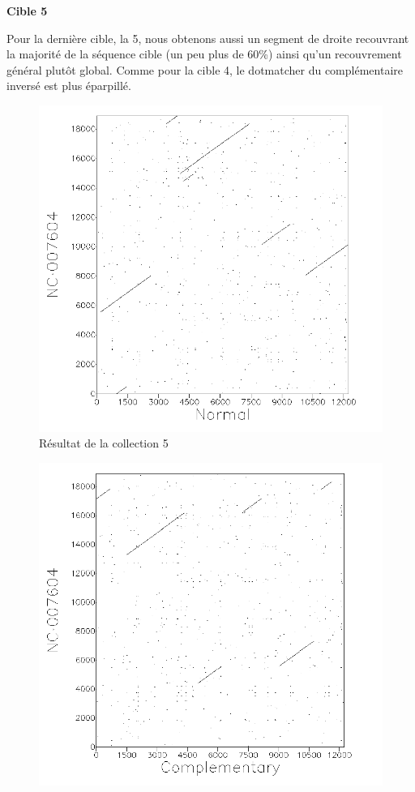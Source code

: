 \FloatBarrier

\noindent\textbf{Cible 5}

Pour la dernière cible, la 5, nous obtenons aussi un segment de droite
recouvrant la majorité de la séquence cible (un peu plus de 60\%) ainsi qu'un
recouvrement général plutôt global. Comme pour la cible 4, le dotmatcher du
complémentaire inversé est plus éparpillé.

\begin{figure}[!ht]
	\begin{minipage}[r]{.46\linewidth}
		\begin{center}
		\includegraphics[scale= 0.4]{../res/cible5.png}
		Résultat de la collection 5
	\end{center}
\end{minipage} \hfill
\begin{minipage}[c]{.46 \linewidth}
	\begin{center}
			\includegraphics[scale= 0.4]{../res/cible5-ic.png}

\end{center}
\end{minipage}
\end{figure}
